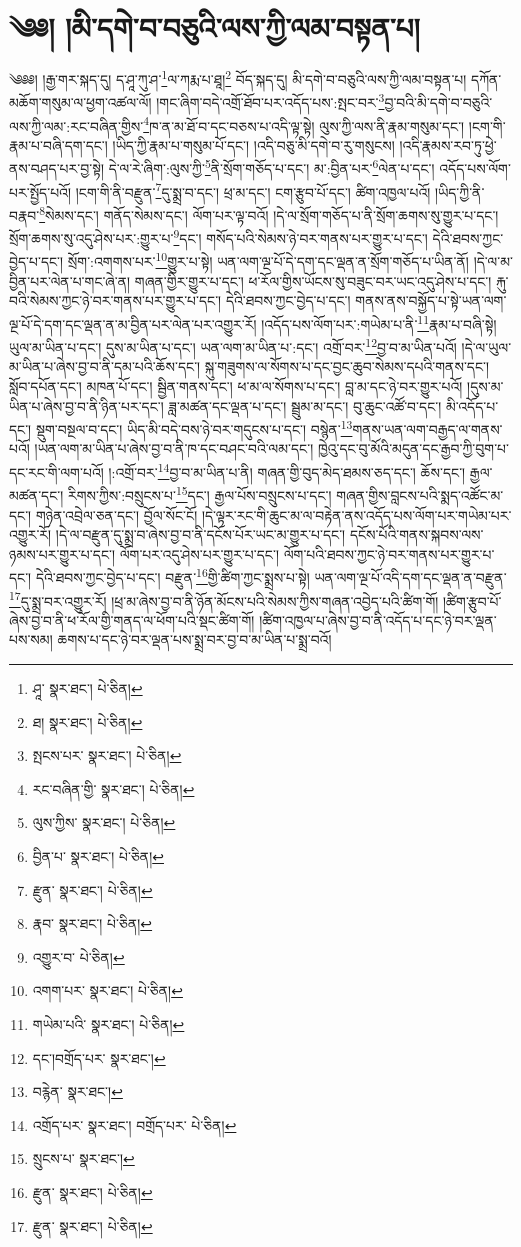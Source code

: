 \setcounter{footnote}{0} 
\chapter{༄༅། །མི་དགེ་བ་བཅུའི་ལས་ཀྱི་ལམ་བསྟན་པ།}༄༅༅། །རྒྱ་གར་སྐད་དུ། ད་ཤཱ་ཀུ་ཤ་\footnote{ཤཱ་  སྣར་ཐང་།  པེ་ཅིན། }ལ་ཀརྨ་པ་ཐཱ།\footnote{ཐ།  སྣར་ཐང་།  པེ་ཅིན། } བོད་སྐད་དུ། མི་དགེ་བ་བཅུའི་ལས་ཀྱི་ལམ་བསྟན་པ། དཀོན་མཆོག་གསུམ་ལ་ཕྱག་འཚལ་ལོ། །གང་ཞིག་བདེ་འགྲོ་ཐོབ་པར་འདོད་པས་:སྤང་བར་\footnote{སྤངས་པར་  སྣར་ཐང་།  པེ་ཅིན། }བྱ་བའི་མི་དགེ་བ་བཅུའི་ལས་ཀྱི་ལམ་:རང་བཞིན་གྱིས་\footnote{རང་བཞིན་གྱི་  སྣར་ཐང་།  པེ་ཅིན། }ཁ་ན་མ་ཐོ་བ་དང་བཅས་པ་འདི་ལྟ་སྟེ། ལུས་ཀྱི་ལས་ནི་རྣམ་གསུམ་དང་། །ངག་གི་རྣམ་པ་བཞི་དག་དང་། །ཡིད་ཀྱི་རྣམ་པ་གསུམ་པོ་དང་། །འདི་བཅུ་མི་དགེ་བ་རུ་གསུངས། །འདི་རྣམས་རབ་ཏུ་ཕྱེ་ནས་བཤད་པར་བྱ་སྟེ། དེ་ལ་རེ་ཞིག་:ལུས་ཀྱི་\footnote{ལུས་ཀྱིས་  སྣར་ཐང་།  པེ་ཅིན། }ནི་སྲོག་གཅོད་པ་དང་། མ་:བྱིན་པར་\footnote{བྱིན་པ་  སྣར་ཐང་།  པེ་ཅིན། }ལེན་པ་དང་། འདོད་པས་ལོག་པར་སྤྱོད་པའོ། །ངག་གི་ནི་བརྫུན་\footnote{རྫུན་  སྣར་ཐང་།  པེ་ཅིན། }དུ་སྨྲ་བ་དང་། ཕྲ་མ་དང་། ངག་རྩུབ་པོ་དང་། ཚིག་འཁྱལ་པའོ། །ཡིད་ཀྱི་ནི་བརྣབ་\footnote{རྣབ་  སྣར་ཐང་།  པེ་ཅིན། }སེམས་དང་། གནོད་སེམས་དང་། ལོག་པར་ལྟ་བའོ། །དེ་ལ་སྲོག་གཅོད་པ་ནི་སྲོག་ཆགས་སུ་གྱུར་པ་དང་། སྲོག་ཆགས་སུ་འདུ་ཤེས་པར་:གྱུར་པ་\footnote{འགྱུར་བ་  པེ་ཅིན། }དང་། གསོད་པའི་སེམས་ཉེ་བར་གནས་པར་གྱུར་པ་དང་། དེའི་ཐབས་ཀྱང་བྱེད་པ་དང་། སྲོག་:འགགས་པར་\footnote{འགག་པར་  སྣར་ཐང་།  པེ་ཅིན། }གྱུར་པ་སྟེ། ཡན་ལག་ལྔ་པོ་དེ་དག་དང་ལྡན་ན་སྲོག་གཅོད་པ་ཡིན་ནོ། །དེ་ལ་མ་བྱིན་པར་ལེན་པ་གང་ཞེ་ན། གཞན་གྱིར་གྱུར་པ་དང་། ཕ་རོལ་གྱིས་ཡོངས་སུ་བཟུང་བར་ཡང་འདུ་ཤེས་པ་དང་། རྐུ་བའི་སེམས་ཀྱང་ཉེ་བར་གནས་པར་གྱུར་པ་དང་། དེའི་ཐབས་ཀྱང་བྱེད་པ་དང་། གནས་ནས་བསྐྱོད་པ་སྟེ་ཡན་ལག་ལྔ་པོ་དེ་དག་དང་ལྡན་ན་མ་བྱིན་པར་ལེན་པར་འགྱུར་རོ། །འདོད་པས་ལོག་པར་:གཡེམ་པ་ནི་\footnote{གཡེམ་པའི་  སྣར་ཐང་།  པེ་ཅིན། }རྣམ་པ་བཞི་སྟེ། ཡུལ་མ་ཡིན་པ་དང་། དུས་མ་ཡིན་པ་དང་། ཡན་ལག་མ་ཡིན་པ་:དང་། འགྲོ་བར་\footnote{དང་།བགྲོད་པར་  སྣར་ཐང་། }བྱ་བ་མ་ཡིན་པའོ། །དེ་ལ་ཡུལ་མ་ཡིན་པ་ཞེས་བྱ་བ་ནི་དམ་པའི་ཆོས་དང་། སྐུ་གཟུགས་ལ་སོགས་པ་དང་བྱང་ཆུབ་སེམས་དཔའི་གནས་དང་། སློབ་དཔོན་དང་། མཁན་པོ་དང་། སྦྱིན་གནས་དང་། ཕ་མ་ལ་སོགས་པ་དང་། བླ་མ་དང་ཉེ་བར་གྱུར་པའོ། །དུས་མ་ཡིན་པ་ཞེས་བྱ་བ་ནི་ཉིན་པར་དང་། ཟླ་མཚན་དང་ལྡན་པ་དང་། སྦྲུམ་མ་དང་། བུ་ཆུང་འཚོ་བ་དང་། མི་འདོད་པ་དང་། སྡུག་བསྔལ་བ་དང་། ཡིད་མི་བདེ་བས་ཉེ་བར་གདུངས་པ་དང་། བསྙེན་\footnote{བརྙེན་  སྣར་ཐང་། }གནས་ཡན་ལག་བརྒྱད་ལ་གནས་པའོ། །ཡན་ལག་མ་ཡིན་པ་ཞེས་བྱ་བ་ནི་ཁ་དང་བཤང་བའི་ལམ་དང་། ཁྱེའུ་དང་བུ་མོའི་མདུན་དང་རྒྱབ་ཀྱི་བུག་པ་དང་རང་གི་ལག་པའོ། །:འགྲོ་བར་\footnote{འགྲོད་པར་  སྣར་ཐང་། བགྲོད་པར་  པེ་ཅིན། }བྱ་བ་མ་ཡིན་པ་ནི། གཞན་གྱི་བུད་མེད་ཐམས་ཅད་དང་། ཆོས་དང་། རྒྱལ་མཚན་དང་། རིགས་ཀྱིས་:བསྲུངས་པ་\footnote{སྲུངས་པ་  སྣར་ཐང་། }དང་། རྒྱལ་པོས་བསྲུངས་པ་དང་། གཞན་གྱིས་བླངས་པའི་སྨད་འཚོང་མ་དང་། གཉེན་འབྲེལ་ཅན་དང་། བྱོལ་སོང་ངོ། །དེ་ལྟར་རང་གི་ཆུང་མ་ལ་བརྟེན་ནས་འདོད་པས་ལོག་པར་གཡེམ་པར་འགྱུར་རོ། །དེ་ལ་བརྫུན་དུ་སྨྲ་བ་ཞེས་བྱ་བ་ནི་དངོས་པོར་ཡང་མ་གྱུར་པ་དང་། དངོས་པོའི་གནས་སྐབས་ལས་ཉམས་པར་གྱུར་པ་དང་། ལོག་པར་འདུ་ཤེས་པར་གྱུར་པ་དང་། ལོག་པའི་ཐབས་ཀྱང་ཉེ་བར་གནས་པར་གྱུར་པ་དང་། དེའི་ཐབས་ཀྱང་བྱེད་པ་དང་། བརྫུན་\footnote{རྫུན་  སྣར་ཐང་།  པེ་ཅིན། }གྱི་ཚིག་ཀྱང་སྨྲས་པ་སྟེ། ཡན་ལག་ལྔ་པོ་འདི་དག་དང་ལྡན་ན་བརྫུན་\footnote{རྫུན་  སྣར་ཐང་།  པེ་ཅིན། }དུ་སྨྲ་བར་འགྱུར་རོ། །ཕྲ་མ་ཞེས་བྱ་བ་ནི་ཉོན་མོངས་པའི་སེམས་ཀྱིས་གཞན་འབྱེད་པའི་ཚིག་གོ། །ཚིག་རྩུབ་པོ་ཞེས་བྱ་བ་ནི་ཕ་རོལ་གྱི་གནད་ལ་ཕོག་པའི་སྡང་ཚིག་གོ། །ཚིག་འཁྱལ་པ་ཞེས་བྱ་བ་ནི་འདོད་པ་དང་ཉེ་བར་ལྡན་པས་སམ། ཆགས་པ་དང་ཉེ་བར་ལྡན་པས་སྨྲ་བར་བྱ་བ་མ་ཡིན་པ་སྨྲ་བའོ། 